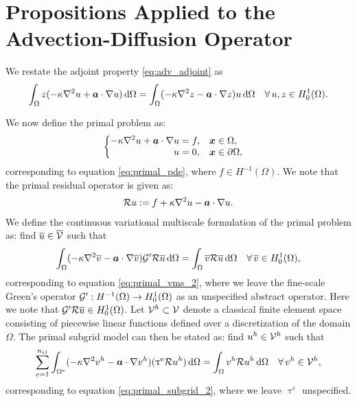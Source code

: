 \section{Propositions Applied to the Advection-Diffusion Operator}
\label{app:propositions}

We restate the adjoint property \eqref{eq:adv_adjoint} as
%
\begin{gather}
\int_{\Omega} z(-\kappa \nabla^2 {u} + \boldsymbol{a} \cdot \nabla {u}) \, \text{d} \Omega =
\int_{\Omega} (-\kappa \nabla^2 {z} - \boldsymbol{a} \cdot \nabla {z}) u \, \text{d} \Omega
\quad \forall \, u,z \in H^1_0(\Omega).
\label{eq:app_adjoint}
\end{gather}
%

We now define the primal problem as:
%
\begin{gather}
\begin{cases}
\begin{aligned}
-\kappa \nabla^2 {u} + \boldsymbol{a} \cdot \nabla {u} &= f, & & \boldsymbol{x} \in \Omega, \\
u &= 0, & & \boldsymbol{x} \in \partial \Omega,
\end{aligned}
\end{cases}
\label{eq:app_primal_pde}
\end{gather}
%
corresponding to equation \eqref{eq:primal_pde},
where $f \in H^{-1}(\Omega)$.
We note that the primal residual operator is given as:
%
\begin{gather}
\mathcal{R} u := f + \kappa \nabla^2 {u} - \boldsymbol{a} \cdot \nabla {u}.
\label{eq:app_primal_residual}
\end{gather}
We define the continuous variational multiscale formulation
of the primal problem as: find $\overline{u} \in \overline{\mathcal{V}}$ such that
%
\begin{gather}
\int_{\Omega} (-\kappa \nabla^2 {\overline{v}} - \boldsymbol{a} \cdot \nabla {\overline{v}}) \mathcal{G}' \mathcal{R} \overline{u} \, \text{d} \Omega =
\int_{\Omega} \overline{v} \mathcal{R} \overline{u} \, \text{d} \Omega
\quad \forall \, \overline{v} \in H^1_0(\Omega),
\label{eq:app_primal_vms}
\end{gather}
%
corresponding to equation \eqref{eq:primal_vms_2}, where we
leave the fine-scale Green's operator
$\mathcal{G}' : H^{-1}(\Omega) \to H^1_0(\Omega)$
as an unspecified
abstract operator.
Here we note that $\mathcal{G}' \mathcal{R} \overline{u} \in H^1_0(\Omega)$.
Let $\mathcal{V}^h \subset \mathcal{V}$ denote a classical finite element space consisting
of piecewise linear functions defined over a discretization of the
domain $\Omega$. The primal subgrid model can then be stated as: find
$u^h \in \mathcal{V}^h$ such that
%
\begin{gather}
\sum_{e=1}^{n_{el}} \int_{\Omega^e} (-\kappa \nabla^2 {v^h} - \boldsymbol{a} \cdot \nabla {v^h}) ( \uptau^e \mathcal{R} u^h)
\, \text{d} \Omega =
\int_{\Omega} v^h \mathcal{R} u^h \, \text{d} \Omega
\quad \forall \, v^h \in \mathcal{V}^h,
\label{eq:app_primal_subgrid}
\end{gather}
%
corresponding to equation \eqref{eq:primal_subgrid_2}, where we
leave $\uptau^e$ unspecified.

